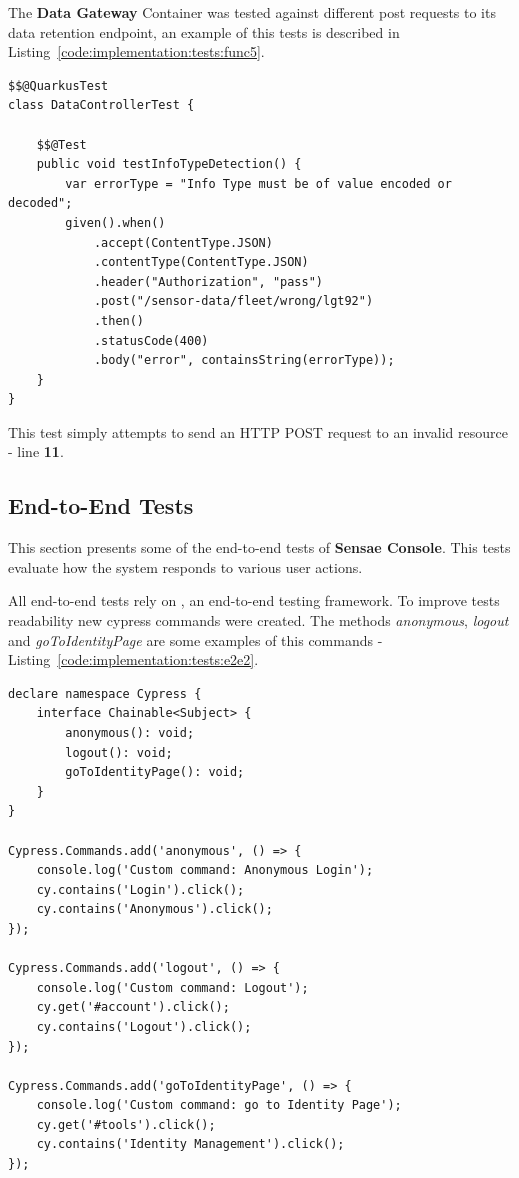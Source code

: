 The \textbf{Data Gateway} Container was tested against different post requests to its data retention endpoint, an example of this tests is described in Listing~\ref{code:implementation:tests:func5}.

\begin{lstlisting}[style=Java, caption=Functional Test - Rest Client Interaction - \textbf{Data Gateway}, label={code:implementation:tests:func5}]
$$@QuarkusTest
class DataControllerTest {

    $$@Test
    public void testInfoTypeDetection() {
        var errorType = "Info Type must be of value encoded or decoded";
        given().when()
            .accept(ContentType.JSON)
            .contentType(ContentType.JSON)
            .header("Authorization", "pass")
            .post("/sensor-data/fleet/wrong/lgt92")
            .then()
            .statusCode(400)
            .body("error", containsString(errorType));
    }
}
\end{lstlisting}

This test simply attempts to send an HTTP POST request to an invalid resource - line \textbf{11}.

\subsection{End-to-End Tests}
\label{subsec:implementation:tests:endtoend}

This section presents some of the end-to-end tests of \textbf{Sensae Console}.
This tests evaluate how the system responds to various user actions.

All end-to-end tests rely on , an end-to-end testing framework.
To improve tests readability new cypress commands were created.
The methods \textit{anonymous}, \textit{logout} and \textit{goToIdentityPage} are some examples of this commands - Listing~\ref{code:implementation:tests:e2e2}.

\begin{lstlisting}[style=javascript, caption=End-to-End Test - Custom Commands - \textbf{UI Aggregator}, label={code:implementation:tests:e2e2}]
declare namespace Cypress {
    interface Chainable<Subject> {
        anonymous(): void;
        logout(): void;
        goToIdentityPage(): void;
    }
}
    
Cypress.Commands.add('anonymous', () => {
    console.log('Custom command: Anonymous Login');
    cy.contains('Login').click();
    cy.contains('Anonymous').click();
});
    
Cypress.Commands.add('logout', () => {
    console.log('Custom command: Logout');
    cy.get('#account').click();
    cy.contains('Logout').click();
});
    
Cypress.Commands.add('goToIdentityPage', () => {
    console.log('Custom command: go to Identity Page');
    cy.get('#tools').click();
    cy.contains('Identity Management').click();
});
\end{lstlisting}

